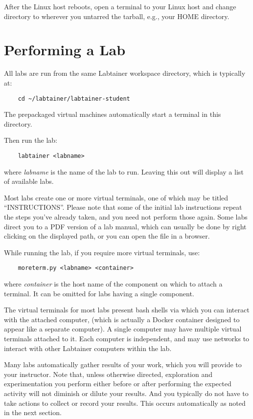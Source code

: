 \documentclass[12pt]{article}
\begin{document}
After the Linux host reboots, open a terminal to your Linux host and
change directory to wherever you untarred the tarball, e.g., your HOME directory.

\section{Performing a Lab}
All labs are run from the same Labtainer workspace directory, which is typically at:
\begin{verbatim}
    cd ~/labtainer/labtainer-student
\end{verbatim}
\noindent The prepackaged virtual machines automatically start a terminal in this directory.

Then run the lab:
\begin{verbatim}
    labtainer <labname>
\end{verbatim}
\noindent where \textit{labname} is the name of the lab to run.  Leaving this out will 
display a list of available labs.  

Most labs create one or more virtual terminals, one of which may be titled ``INSTRUCTIONS''.
Please note that some of the initial lab instructions repeat the steps you've already taken, and you need
not perform those again.  Some labs direct you to a PDF version of a lab manual, which can usually 
be done by right clicking on the displayed path, or you can open the file in a browser.

While running the lab, if you require more virtual terminals, use:
\begin{verbatim}
    moreterm.py <labname> <container>
\end{verbatim}
\noindent where \textit{container} is the host name of the component on which to attach a terminal.  
It can be omitted for labs having a single component.

The virtual terminals for most labs present bash shells via which you can interact
with the attached computer, (which is actually a Docker container designed to appear
like a separate computer).  A single computer
may have multiple virtual terminals attached to it.  Each computer is independent, and 
may use networks to interact with other Labtainer computers within the lab.  

Many labs automatically gather results of your work, which you will provide to your instructor.
Note that, unless otherwise directed, exploration and experimentation you perform either before
or after performing the expected activity will not diminish or dilute your results.  And you typically
do not have to take actions to collect or record your results.  This occurs automatically as noted in the 
next section.  
\end{document}
